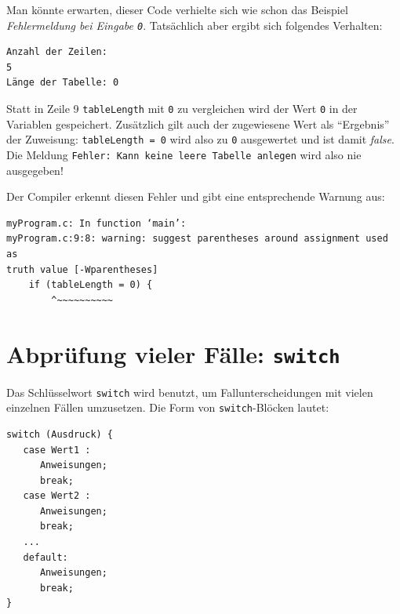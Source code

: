 \begin{warnbox}[]
Man könnte erwarten, dieser Code verhielte sich wie schon das Beispiel \emph{Fehlermeldung bei Eingabe \texttt{0}}. Tatsächlich aber ergibt sich folgendes Verhalten:

\begin{cmdbox}
\begin{verbatim}
Anzahl der Zeilen:
5
Länge der Tabelle: 0
\end{verbatim}
\end{cmdbox}

Statt in Zeile 9 \texttt{tableLength} mit \texttt{0} zu vergleichen wird der Wert \texttt{0} in der Variablen gespeichert. Zusätzlich gilt auch der zugewiesene Wert als \enquote{Ergebnis} der Zuweisung: \texttt{tableLength = 0} wird also zu \texttt{0} ausgewertet und ist damit \emph{false}. Die Meldung \texttt{Fehler: Kann keine leere Tabelle anlegen} wird also nie ausgegeben!

Der Compiler erkennt diesen Fehler und gibt eine entsprechende Warnung aus:

\begin{cmdbox}
\begin{verbatim}
myProgram.c: In function ‘main’:
myProgram.c:9:8: warning: suggest parentheses around assignment used as 
truth value [-Wparentheses]
    if (tableLength = 0) {
        ^~~~~~~~~~~
\end{verbatim}
\end{cmdbox}
\end{warnbox}

\section{Abprüfung vieler Fälle: \texttt{switch}}
Das Schlüsselwort \texttt{switch} wird benutzt, um Fallunterscheidungen mit vielen einzelnen Fällen umzusetzen. Die Form von \texttt{switch}-Blöcken lautet:

\begin{codebox}
\begin{verbatim}
switch (Ausdruck) {
   case Wert1 :
      Anweisungen;
      break;
   case Wert2 :
      Anweisungen;
      break;
   ...
   default:
      Anweisungen;
      break;
}
\end{verbatim}
\end{codebox}

